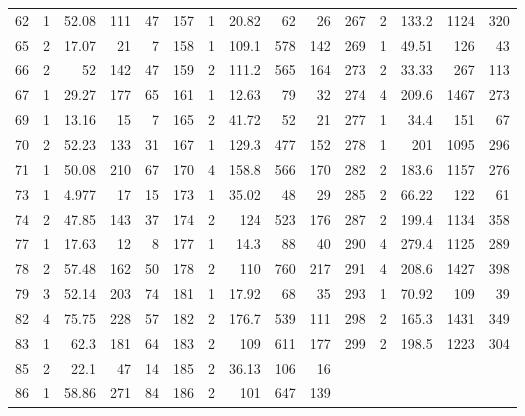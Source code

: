 \begin{small}
\begin{longtable}{rrrrr|rrrrr|rrrrr}
62 & 1 & 52.08 & 111 & 47 & 157 & 1 & 20.82 & 62 & 26 & 267 & 2 & 133.2 & 1124 & 320\\
65 & 2 & 17.07 & 21 & 7 & 158 & 1 & 109.1 & 578 & 142 & 269 & 1 & 49.51 & 126 & 43\\
66 & 2 & 52 & 142 & 47 & 159 & 2 & 111.2 & 565 & 164 & 273 & 2 & 33.33 & 267 & 113\\
67 & 1 & 29.27 & 177 & 65 & 161 & 1 & 12.63 & 79 & 32 & 274 & 4 & 209.6 & 1467 & 273\\
69 & 1 & 13.16 & 15 & 7 & 165 & 2 & 41.72 & 52 & 21 & 277 & 1 & 34.4 & 151 & 67\\
70 & 2 & 52.23 & 133 & 31 & 167 & 1 & 129.3 & 477 & 152 & 278 & 1 & 201 & 1095 & 296\\
71 & 1 & 50.08 & 210 & 67 & 170 & 4 & 158.8 & 566 & 170 & 282 & 2 & 183.6 & 1157 & 276\\
73 & 1 & 4.977 & 17 & 15 & 173 & 1 & 35.02 & 48 & 29 & 285 & 2 & 66.22 & 122 & 61\\
74 & 2 & 47.85 & 143 & 37 & 174 & 2 & 124 & 523 & 176 & 287 & 2 & 199.4 & 1134 & 358\\
77 & 1 & 17.63 & 12 & 8 & 177 & 1 & 14.3 & 88 & 40 & 290 & 4 & 279.4 & 1125 & 289\\
78 & 2 & 57.48 & 162 & 50 & 178 & 2 & 110 & 760 & 217 & 291 & 4 & 208.6 & 1427 & 398\\
79 & 3 & 52.14 & 203 & 74 & 181 & 1 & 17.92 & 68 & 35 & 293 & 1 & 70.92 & 109 & 39\\
82 & 4 & 75.75 & 228 & 57 & 182 & 2 & 176.7 & 539 & 111 & 298 & 2 & 165.3 & 1431 & 349\\
83 & 1 & 62.3 & 181 & 64 & 183 & 2 & 109 & 611 & 177 & 299 & 2 & 198.5 & 1223 & 304\\
85 & 2 & 22.1 & 47 & 14 & 185 & 2 & 36.13 & 106 & 16 &  & & & & \\
86 & 1 & 58.86 & 271 & 84 & 186 & 2 & 101 & 647 & 139 &  & & & & \\
\bottomrule
\end{longtable}
\end{small}
